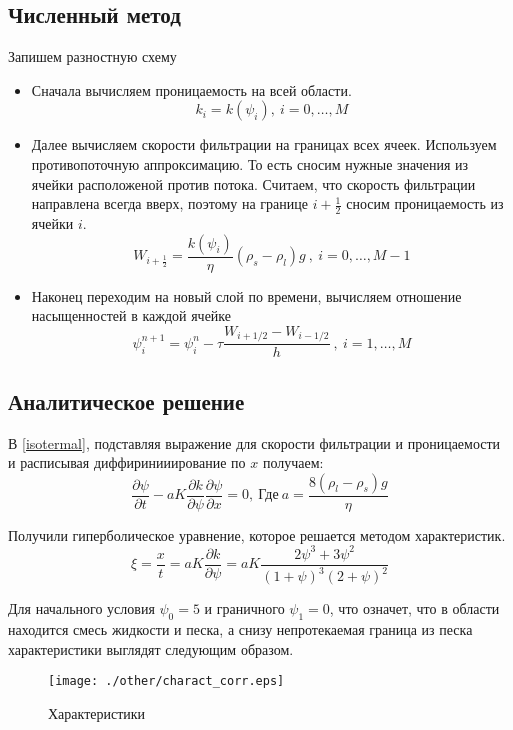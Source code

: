 \documentclass[12pt,a4paper]{article}
\newcommand{\pd}[2]{\frac{\partial #1}{\partial #2}}
\begin{document}
\subsection{Численный метод}
Запишем разностную схему
\begin{itemize}
\item Сначала вычисляем проницаемость на всей области.
\begin{equation}
k_i = k(\psi_i) , \ i = 0,  \dots ,M
\label{perm_razn}
\end{equation}

\item Далее вычисляем скорости фильтрации на границах всех ячеек. Используем противопоточную аппроксимацию. То есть сносим нужные значения из ячейки расположеной против потока. Считаем, что скорость фильтрации направлена всегда вверх, поэтому на границе $i + \frac12$ сносим проницаемость из ячейки $i$.
\begin{equation}
W_{i+\frac12} = \frac{k(\psi_i)}{\eta}(\rho_s-\rho_l)g \ , \ i = 0,  \dots ,M-1
\label{Darsi_razn}
\end{equation}

\item Наконец переходим на новый слой по времени, вычисляем отношение насыщенностей в каждой ячейке
\begin{equation}
\psi_i^{n+1} = \psi_i^n - \tau\frac{W_{i+1/2} - W_{i-1/2}}{h} \ , \ i = 1,  \dots ,M
\label{filtr_razn}
\end{equation}
\end{itemize}

\subsection{Аналитическое решение}
В \eqref{isotermal}, подставляя выражение для скорости фильтрации и проницаемости и расписывая диффиринииирование по $x$ получаем:
\begin{equation}
\pd{\psi}{t} - a K \pd{k}{\psi} \pd{\psi}{x} = 0,\  \text{Где}\ a = \frac{8(\rho_l-\rho_s)g}{\eta}
\label{characteristics}
\end{equation}

Получили гиперболическое уравнение, которое решается методом характеристик. 
$$
\xi = \frac{x}{t} = a K \pd{k}{\psi} =   a K \frac{2\psi^3 + 3\psi^2}{(1 + \psi)^3(2+\psi)^2}
$$

Для начального условия $\psi_0 = 5$ и граничного $\psi_1 = 0$, что означет, что в области находится смесь жидкости и песка, а снизу непротекаемая граница из песка характеристики выглядят следующим образом.
\begin{figure}[h!]
\begin{center}
\texttt{[image: ./other/charact\_corr.eps]}
\caption{Характеристики}
\end{center}
\end{figure}
\end{document}
